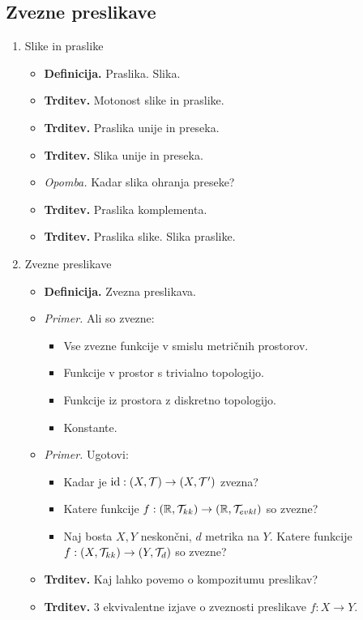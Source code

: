 \subsection{Zvezne preslikave}
\begin{enumerate}
    \item Slike in praslike
    \begin{itemize}
        \item \colorbox{purple!30}{\textbf{Definicija.}} Praslika. Slika.
        \item \colorbox{blue!30}{\textbf{Trditev.}} Motonost slike in praslike.
        \item \colorbox{blue!30}{\textbf{Trditev.}} Praslika unije in preseka.
        \item \colorbox{blue!30}{\textbf{Trditev.}} Slika unije in preseka.
        \item \colorbox{yellow!30}{\emph{Opomba.}} Kadar slika ohranja preseke?
        \item \colorbox{blue!30}{\textbf{Trditev.}} Praslika komplementa.
        \item \colorbox{blue!30}{\textbf{Trditev.}} Praslika slike. Slika praslike.
    \end{itemize}

    \item Zvezne preslikave
    \begin{itemize}
        \item \colorbox{purple!30}{\textbf{Definicija.}} Zvezna preslikava.
        \item \colorbox{yellow!30}{\emph{Primer.}} Ali so zvezne:
        \begin{itemize}
            \item Vse zvezne funkcije v smislu metričnih prostorov.
            \item Funkcije v prostor s trivialno topologijo.
            \item Funkcije iz prostora z diskretno topologijo.
            \item Konstante.            
        \end{itemize}
        \item \colorbox{yellow!30}{\emph{Primer.}} Ugotovi:
        \begin{itemize}
            \item Kadar je $\operatorname{id}: (X, \mathcal{T}) \to (X, \mathcal{T}')$ zvezna?
            \item Katere funkcije $f: (\mathbb{R}, \mathcal{T}_{kk}) \to (\mathbb{R}, \mathcal{T}_{evkl})$ so zvezne?
            \item Naj bosta $X, Y$ neskončni, $d$ metrika na $Y$. Katere funkcije $f: (X, \mathcal{T}_{kk}) \to (Y, \mathcal{T}_{d})$ so zvezne?
        \end{itemize}
        \item \colorbox{blue!30}{\textbf{Trditev.}} Kaj lahko povemo o kompozitumu preslikav?
        \item \colorbox{blue!30}{\textbf{Trditev.}} 3 ekvivalentne izjave o zveznosti preslikave $f: X \to Y$.
    \end{itemize}
\end{enumerate}

